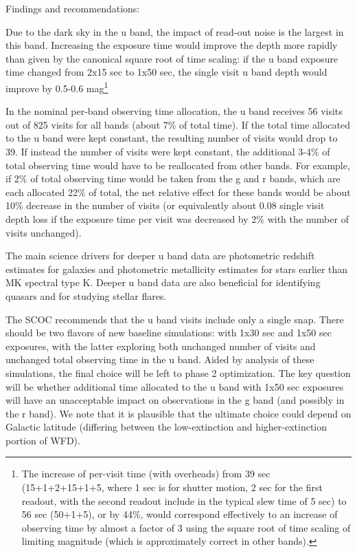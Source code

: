 Findings and recommendations:

Due to the dark sky in the u band, the impact of read-out noise is the largest in this band. Increasing the exposure time would improve the depth more rapidly than given by the canonical  square root of time scaling: if the u band exposure time changed from 2x15 sec to 1x50 sec, the single visit u band depth would improve by 0.5-0.6 mag\footnote{The increase of per-visit time (with overheads) from 39 sec (15+1+2+15+1+5, where 1 sec is for shutter motion, 2 sec for the first readout, with the second readout include in the typical slew time of 5 sec) to 56 sec (50+1+5), or by 44\%, would correspond effectively to an increase of observing time by almost a factor of 3 using the square root of time scaling of limiting magnitude (which is approximately correct in other bands). }

In the nominal per-band observing time allocation, the u band receives 56 visits out of 825 visits for all bands (about 7\% of total time). If the total time allocated to the u band were kept constant, the resulting number of visits would drop to 39. If instead the number of visits were kept constant, the additional 3-4\% of total observing time would have to be reallocated from other bands. For example, if 2\% of total observing time would be taken from the g and r bands, which are each allocated 22\% of total, the net relative effect for these bands would be about 10\% decrease in the number of visits (or equivalently about 0.08 single visit depth loss if the exposure time per visit was decreased by 2\% with the number of visits unchanged). 

The main science drivers for deeper u band data are photometric redshift estimates for galaxies and photometric metallicity estimates for stars earlier than MK spectral type K.  Deeper u band data are also beneficial for identifying quasars and for studying stellar flares.

The SCOC recommends that the u band visits include only a single snap. There should be two flavors of new baseline simulations: with 1x30 sec and 1x50 sec exposures, with the latter exploring both unchanged number of visits and unchanged total observing time in the u band. Aided by analysis of these simulations, the final choice will be left to phase 2 optimization. The key question will be whether additional time allocated to the u band with 1x50 sec exposures will have an unacceptable impact on observations in the g band (and possibly in the r band). We note that it is plausible that the ultimate choice could depend on Galactic latitude (differing between the low-extinction and higher-extinction portion of WFD).


